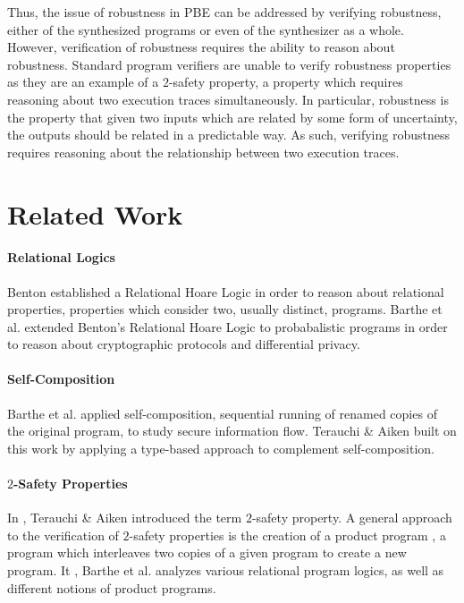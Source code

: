 \documentclass{llncs}
\begin{document}
Thus, the issue of robustness in PBE can be addressed by verifying robustness, either of the synthesized programs or even of the synthesizer as a whole.  However, verification of robustness requires the ability to reason about robustness.  Standard program verifiers are unable to verify robustness properties as they are an example of a \(2\)-safety property, a property which requires reasoning about two execution traces simultaneously.  In particular, robustness is the property that given two inputs which are related by some form of uncertainty, the outputs should be related in a predictable way.  As such, verifying robustness requires reasoning about the relationship between two execution traces.

\section{Related Work}

\paragraph{Relational Logics} Benton \cite{benton} established a Relational Hoare Logic in order to reason about relational properties, properties which consider two, usually distinct, programs.  Barthe et al. \cite{barthecrypto,bartheprivacy} extended Benton's Relational Hoare Logic to probabalistic programs in order to reason about cryptographic protocols and differential privacy.

\paragraph{Self-Composition} Barthe et al. \cite{barthecomposition} applied self-composition, sequential running of renamed copies of the original program, to study secure information flow.  Terauchi \& Aiken \cite{terauchi05} built on this work by applying a type-based approach to complement self-composition.

\paragraph{\(2\)-Safety Properties} In \cite{terauchi05}, Terauchi \& Aiken introduced the term \(2\)-safety property.  A general approach to the verification of \(2\)-safety properties is the creation of a product program \cite{bartheproduct}, a program which interleaves two copies of a given program to create a new program.  It \cite{bartheanalysis}, Barthe et al. analyzes various relational program logics, as well as different notions of product programs.
\end{document}

